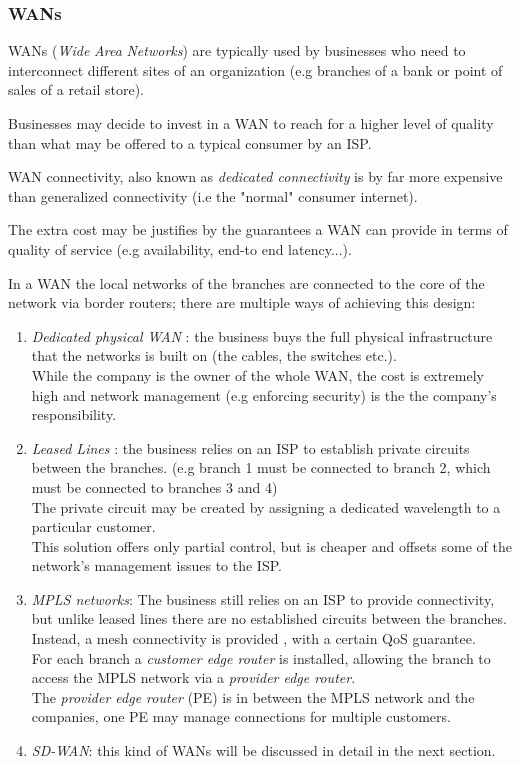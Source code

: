 \documentclass{report}
\begin{document}
  \subsubsection{WANs}
  WANs (\textit{Wide} \textit{Area} \textit{Networks}) are typically used by businesses who need to interconnect different sites of an organization (e.g branches of a bank or point of sales of a retail store).

  Businesses may decide to invest in a WAN to reach for a higher level of quality than what may be offered to a typical consumer by an ISP.
   
  WAN connectivity, also known as \textit{dedicated connectivity} is by far more expensive than generalized connectivity (i.e the "normal" consumer internet).
  
   The extra cost may be justifies by the guarantees a WAN can provide in terms of quality of service (e.g availability, end-to end latency...).
   
   In a WAN the local networks of the branches are connected to the core of the network via border routers; there are multiple ways of achieving this design:
   
   \begin{enumerate}
   	\item \textit{Dedicated physical WAN} : the business buys the full physical infrastructure that the networks is built on (the cables, the switches etc.). \\ While the company is the owner of the whole WAN, the cost is extremely high and network management (e.g enforcing security) is the the company's responsibility.
   	
   	\item \textit{Leased Lines} : the business relies on an ISP to establish private circuits between the branches. (e.g branch 1 must be connected to branch 2, which must be connected to branches 3 and 4) \\
   	The private circuit may be created by assigning  a dedicated wavelength to a particular customer. \\
   	This solution offers only partial control, but is cheaper and offsets some of the network's management issues to the ISP.
   	
   	\item \textit{MPLS networks}: The business still relies on an ISP to provide connectivity, but unlike leased lines there are no established circuits between the branches.  Instead, a mesh connectivity is provided , with a certain QoS guarantee. \\
   	For each branch a \textit{customer edge router} is installed, allowing the branch to access the MPLS network via a \textit{provider edge router}. \\
   	The \textit{provider edge router} (PE) is in between the MPLS network and the companies, one PE may manage connections for multiple customers.
   	
   	\item \textit{SD-WAN}: this kind of WANs will be discussed in detail in the next section.
   	
   \end{enumerate} 
\end{document}
